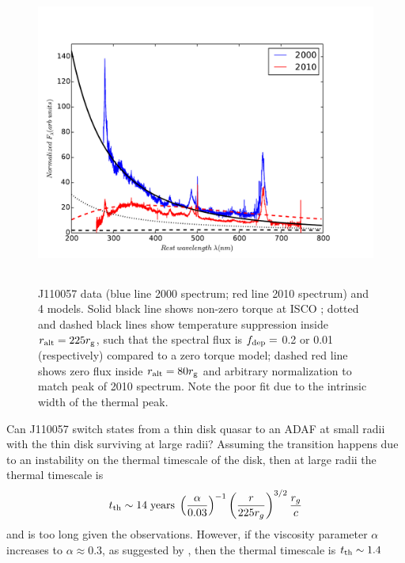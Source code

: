 \documentclass[11pt,a4paper]{article}
\begin{document}
\begin{figure}
  \centering
  \includegraphics[width=12.00cm, height=10.0cm, trim=0.3cm 0.0cm 2.0cm 0.0cm, clip]
  {../plots/models/mcd_gap_v3_3_b1.pdf}
  \caption[]{
J110057 data (blue line 2000 spectrum; red line 2010 spectrum) and 4
models. Solid black line shows non-zero torque at ISCO
\citep[following] []{Afshordi_Paczynski2003}; dotted and dashed black
lines show temperature suppression inside $r_{\rm alt} = 225 r_{\rm
g}$, such that the spectral flux is $f_{\rm dep} = $ 0.2 or 0.01
(respectively) compared to a zero torque model; dashed red line shows
zero flux inside $r_{\rm alt} = 80 r_{\rm g}$ and arbitrary
normalization to match peak of 2010 spectrum. Note the poor fit due to
the intrinsic width of the thermal peak.
  }
  \label{fig:disk_suppression}
\end{figure}
Can J110057 switch states from a thin disk quasar to an ADAF at small
radii with the thin disk surviving at large radii?  Assuming the
transition happens due to an instability on the thermal timescale of
the disk, then at large radii the thermal timescale is
\begin{equation}
    t_{\rm th} \sim 14 \; {\rm years} \; \left(\frac{\alpha}{0.03}\right)^{-1}
                                                \left(\frac{r}{225r_{g}}\right)^{3/2} 
                                                        \frac{r_{g}}{c}
\end{equation} 
and is too long given the observations. However, if the viscosity
parameter $\alpha$ increases to $\alpha \approx 0.3$, as suggested by
\citet{King2007}, then the thermal timescale is $t_{\rm th} \sim 1.4$
\end{document}
